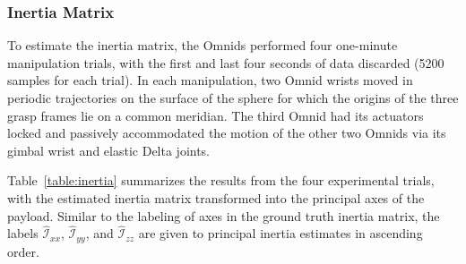 \documentclass[letterpaper, 10 pt, journal, twoside]{IEEEtran}
\newcommand{\inertia}{{\mathcal{I}}}
\begin{document}


\subsubsection{Inertia Matrix}

To estimate the inertia matrix, the Omnids performed four one-minute manipulation trials, with the first and last four seconds of data discarded (5200 samples for each trial). In each manipulation, two Omnid wrists moved in periodic trajectories on the surface of the sphere for which the origins of the three grasp frames lie on a common meridian. The third Omnid had its actuators locked and passively accommodated the motion of the other two Omnids via its gimbal wrist and elastic Delta joints. 


Table~\ref{table:inertia} summarizes the results from the four experimental trials, with the estimated inertia matrix transformed into the principal axes of the payload. Similar to the labeling of axes in the ground truth inertia matrix, the labels $\hat{\inertia}_{xx}$, $\hat{\inertia}_{yy}$, and $\hat{\inertia}_{zz}$ are given to principal inertia estimates in ascending order.
\end{document}
